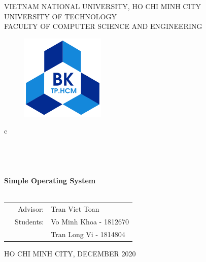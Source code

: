\documentclass[13pt,a4paper]{article}
\begin{document}
	
	\begin{titlepage}
		\begin{center}
			VIETNAM NATIONAL UNIVERSITY, HO CHI MINH CITY \\
			UNIVERSITY OF TECHNOLOGY\\
			FACULTY OF COMPUTER SCIENCE AND ENGINEERING
		\end{center}
		
		\vspace{1cm}
		
		\begin{figure}[h!]
			\begin{center}
				\includegraphics[width=4cm]{hcmut.png}
			\end{center}
		\end{figure}
		
		\vspace{1cm}
		
		\begin{center}
			\color{blue}
			\begin{tabular}{c}
				\\
				~~\\
				\hline
				\\
				\\
				\\
				\textbf{{\Huge Simple Operating System}}\\
				\\
				\hline
			\end{tabular}
			\color{blue}
		\end{center}
		\vspace{1cm}
		
		\begin{table}[h]
			\color{blue}
			\begin{tabular}{rrl}
				\hspace{3 cm} & Advisor: & Tran Viet Toan\\ 
				& Students: & Vo Minh Khoa - 1812670 \\
							& & Tran Long Vi - 1814804 \\
			\end{tabular}
			\color{blue}
		\end{table}
		
		\vspace{0.5 cm}
		\begin{center}
			{\footnotesize\normalsize HO CHI MINH CITY, DECEMBER 2020}
		\end{center}
	\end{titlepage}
	
\end{document}
